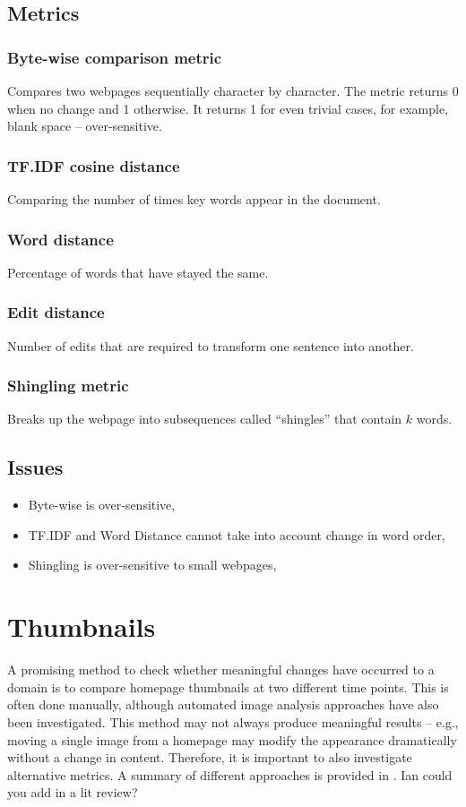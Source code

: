 \documentclass[10pt, a4paper]{article}
\begin{document}
\subsection{Metrics}
\subsubsection*{Byte-wise comparison metric}
Compares two webpages sequentially character by character. The metric returns 0 when no change and 1 otherwise. It returns 1 for even trivial cases, for example, blank space -- over-sensitive.

\subsubsection*{TF.IDF cosine distance}
Comparing the number of times key words appear in the document.

\subsubsection*{Word distance}
Percentage of words that have stayed the same.

\subsubsection*{Edit distance}
Number of edits that are required to transform one sentence into another.

\subsubsection*{Shingling metric}
Breaks up the webpage into subsequences called ``shingles'' that contain $k$ words.

\subsection{Issues}
\begin{itemize}
	\item Byte-wise is over-sensitive,
	\item TF.IDF and Word Distance cannot take into account change in word order,
	\item Shingling is over-sensitive to small webpages,
	
\end{itemize}


\section{Thumbnails}
A promising method to check whether meaningful changes have occurred to a domain is to compare homepage thumbnails at two different time points. This is often done manually, although automated image analysis approaches have also been investigated. This method may not always produce meaningful results -- e.g., moving a single image from a homepage may modify the appearance dramatically without a change in content. Therefore, it is important to also investigate alternative metrics. A summary of different approaches is provided in \cite{kwon2006precise}. {\color{red} Ian could you add in a lit review?}
\end{document}
